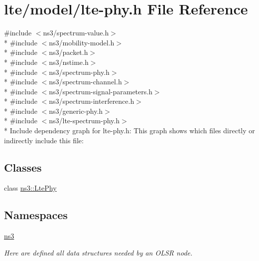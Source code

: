 \hypertarget{lte-phy_8h}{}\section{lte/model/lte-\/phy.h File Reference}
\label{lte-phy_8h}
{\ttfamily \#include $<$ns3/spectrum-\/value.\+h$>$}\\*
{\ttfamily \#include $<$ns3/mobility-\/model.\+h$>$}\\*
{\ttfamily \#include $<$ns3/packet.\+h$>$}\\*
{\ttfamily \#include $<$ns3/nstime.\+h$>$}\\*
{\ttfamily \#include $<$ns3/spectrum-\/phy.\+h$>$}\\*
{\ttfamily \#include $<$ns3/spectrum-\/channel.\+h$>$}\\*
{\ttfamily \#include $<$ns3/spectrum-\/signal-\/parameters.\+h$>$}\\*
{\ttfamily \#include $<$ns3/spectrum-\/interference.\+h$>$}\\*
{\ttfamily \#include $<$ns3/generic-\/phy.\+h$>$}\\*
{\ttfamily \#include $<$ns3/lte-\/spectrum-\/phy.\+h$>$}\\*
Include dependency graph for lte-\/phy.h\+:
This graph shows which files directly or indirectly include this file\+:
\subsection*{Classes}
\begin{DoxyCompactItemize}
\item 
class \hyperlink{classns3_1_1LtePhy}{ns3\+::\+Lte\+Phy}
\end{DoxyCompactItemize}
\subsection*{Namespaces}
\begin{DoxyCompactItemize}
\item 
 \hyperlink{namespacens3}{ns3}
\begin{DoxyCompactList}\small\item\em Here are defined all data structures needed by an O\+L\+SR node. \end{DoxyCompactList}\end{DoxyCompactItemize}
